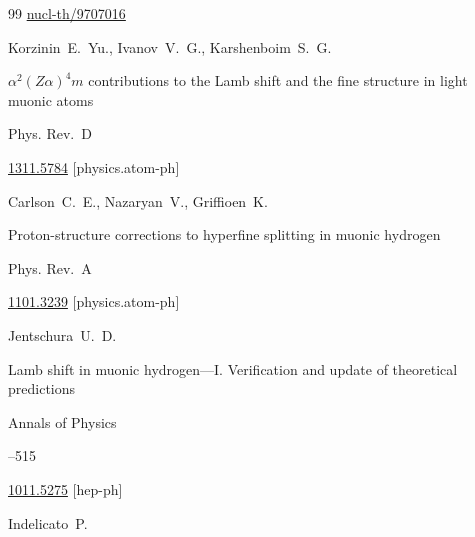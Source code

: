 \begin{thebibliography}{99}
\arxiv \href{http://arxiv.org/abs/nucl-th/9707016}{nucl-th/9707016}




\by Korzinin~E.~Yu., Ivanov~V.~G., Karshenboim~S.~G.

\paper $\alpha^2(Z\alpha)^4 m$ contributions to the Lamb shift and the fine structure in light muonic atoms

\jour Phys. Rev.~D






\arxiv \href{http://arxiv.org/abs/1311.5784}{1311.5784} [physics.atom-ph]




\by Carlson~C.~E., Nazaryan~V., Griffioen~K.

\paper Proton-structure corrections to hyperfine splitting in muonic hydrogen

\jour Phys. Rev.~A






\arxiv \href{http://arxiv.org/abs/1101.3239}{1101.3239} [physics.atom-ph]




\by Jentschura~U.~D.

\paper Lamb shift in muonic hydrogen—I. Verification and update of theoretical predictions

\jour Annals of Physics




--515


\arxiv \href{http://arxiv.org/abs/1011.5275}{1011.5275} [hep-ph]




\by Indelicato~P.


\end{thebibliography}
